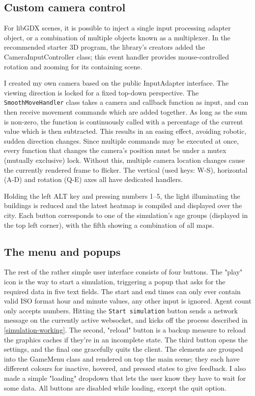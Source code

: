 \subsection{Custom camera control}

For libGDX scenes, it is possible to inject a single input processing adapter object, or a combination of multiple objects known as a multiplexer. In the recommended starter 3D program\cite{basic3DlibGDX}, the library's creators added the CameraInputController class; this event handler provides mouse-controlled rotation and zooming for its containing scene.

I created my own camera based on the public InputAdapter interface. The viewing direction is locked for a fixed top-down perspective. The \verb|SmoothMoveHandler| class takes a camera and callback function as input, and can then receive movement commands which are added together. As long as the sum is non-zero, the function is continuously called with a percentage of the current value which is then subtracted. This results in an easing effect, avoiding robotic, sudden direction changes. Since multiple commands may be executed at once, every function that changes the camera's position must be under a mutex (mutually exclusive) lock. Without this, multiple camera location changes cause the currently rendered frame to flicker. The vertical (used keys: W-S), horizontal (A-D) and rotation (Q-E) axes all have dedicated handlers.

Holding the left ALT key and pressing numbers 1--5, the light illuminating the buildings is reduced and the latest heatmap is compiled and displayed over the city. Each button corresponds to one of the simulation's age groups (displayed in the top left corner), with the fifth showing a combination of all maps.


\subsection{The menu and popups}

The rest of the rather simple user interface consists of four buttons. The "play" icon is the way to start a simulation, triggering a popup that asks for the required data in five text fields. The start and end times can only ever contain valid ISO format hour and minute values, any other input is ignored. Agent count only accepts numbers. Hitting the \verb|Start simulation| button sends a network message on the currently active websocket, and kicks off the process described in \ref{simulation-working}. The second, "reload" button is a backup measure to reload the graphics caches if they're in an incomplete state. The third button opens the settings, and the final one gracefully quits the client. The elements are grouped into the GameMenu class and rendered on top the main scene; they each have different colours for inactive, hovered, and pressed states to give feedback. I also made a simple "loading" dropdown that lets the user know they have to wait for some data. All buttons are disabled while loading, except the quit option.

